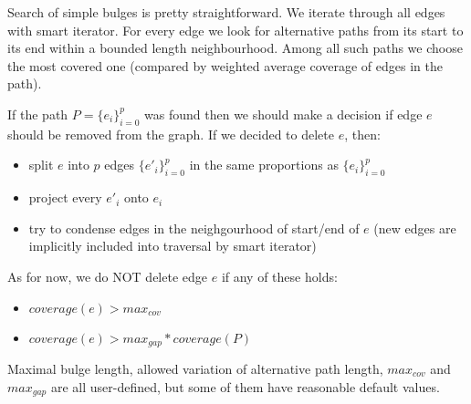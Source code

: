 \documentclass[12pt]{article}
\begin{document}
Search of simple bulges is pretty straightforward.
We iterate through all edges with smart iterator. For every edge we look for alternative paths from its start to its end within a bounded length neighbourhood.
Among all such paths we choose the most covered one (compared by weighted average coverage of edges in the path).  

If the path $P=\{e_i\}_{i=0}^{p}$ was found then we should make a decision if edge $e$ should be removed from the graph. If we decided to delete $e$, then:
\begin{itemize}
\item split $e$ into $p$ edges $\{e'_i\}_{i=0}^{p}$ in the same proportions as $\{e_i\}_{i=0}^{p}$
\item project every $e'_i$ onto $e_i$
\item try to condense edges in the neighgourhood of start/end of $e$ (new edges are implicitly included into traversal by smart iterator)
\end{itemize}

As for now, we do NOT delete edge $e$ if any of these holds:
\begin{itemize}
\item $coverage(e)>max_{cov}$
\item $coverage(e)>max_{gap}*coverage(P)$
\end{itemize}

Maximal bulge length, allowed variation of alternative path length, $max_{cov}$ and $max_{gap}$ are all user-defined, but some of them have reasonable default values.
\end{document}
